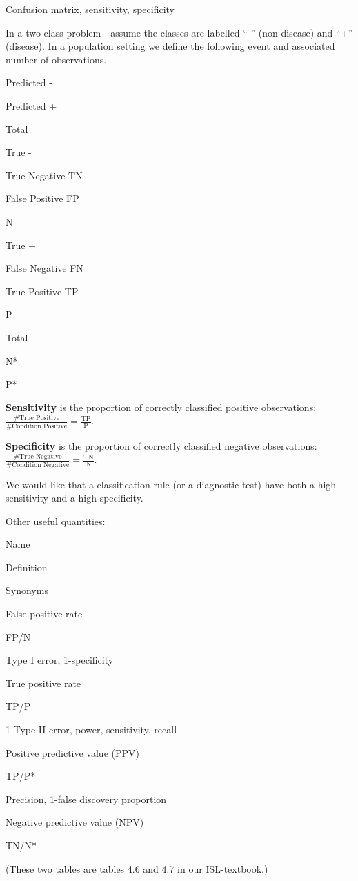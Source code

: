 \documentclass[10pt,ignorenonframetext,]{beamer}
\begin{document}
\begin{frame}{Confusion matrix, sensitivity, specificity}

In a two class problem - assume the classes are labelled ``-'' (non
disease) and ``+'' (disease). In a population setting we define the
following event and associated number of observations.

Predicted -

Predicted +

Total

True -

True Negative TN

False Positive FP

N

True +

False Negative FN

True Positive TP

P

Total

N*

P*

\end{frame}

\begin{frame}

\textbf{Sensitivity} is the proportion of correctly classified positive
observations:
\(\frac{\# \text{True Positive}}{\# \text{Condition Positive}}=\frac{\text{TP}}{\text{P}}\).

\textbf{Specificity} is the proportion of correctly classified negative
observations:
\(\frac{\# \text{True Negative}}{\# \text{Condition Negative}}=\frac{\text{TN}}{\text{N}}\).

We would like that a classification rule (or a diagnostic test) have
both a high sensitivity and a high specificity.

\end{frame}

\begin{frame}

Other useful quantities:

Name

Definition

Synonyms

False positive rate

FP/N

Type I error, 1-specificity

True positive rate

TP/P

1-Type II error, power, sensitivity, recall

Positive predictive value (PPV)

TP/P*

Precision, 1-false discovery proportion

Negative predictive value (NPV)

TN/N*

(These two tables are tables 4.6 and 4.7 in our ISL-textbook.)

\end{frame}
\end{document}

